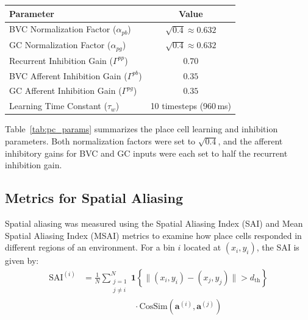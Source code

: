 \documentclass[conference]{IEEEtran}
\begin{document}
\newpage

\begin{center}
\label{tab:pc_params}

\begin{tabular}{l c}
\hline
\textbf{Parameter} & \textbf{Value} \\
\hline
BVC Normalization Factor ($\alpha_{pb}$) & $\sqrt{0.4} \approx 0.632$ \\
GC Normalization Factor ($\alpha_{pg}$) & $\sqrt{0.4} \approx 0.632$ \\
Recurrent Inhibition Gain ($\Gamma^{pp}$) & $0.70$ \\
BVC Afferent Inhibition Gain ($\Gamma^{pb}$) & $0.35$ \\
GC Afferent Inhibition Gain ($\Gamma^{pg}$) & $0.35$ \\
Learning Time Constant ($\tau_w$) & 10 timesteps (960\,ms) \\
\hline
\end{tabular}
\end{center}

Table~\ref{tab:pc_params} summarizes the place cell learning and inhibition parameters. Both normalization factors were set to $\sqrt{0.4}$, and the afferent inhibitory gains for BVC and GC inputs were each set to half the recurrent inhibition gain.


\subsection{Metrics for Spatial Aliasing}
\label{sec:spa_aliasing}

Spatial aliasing was measured using the Spatial Aliasing Index (SAI) and Mean Spatial Aliasing Index (MSAI) metrics to examine how place cells responded in different regions of an environment. For a bin $i$ located at $(x_i, y_i)$, the SAI is given by:
\begin{equation}
\begin{aligned}
\mathrm{SAI}^{(i)} &=
\frac{1}{N}\sum_{\substack{j=1\\ j\neq i}}^{N}
\mathbf{1}\!\left\{\lVert (x_i,y_i)-(x_j,y_j)\rVert > d_{\mathrm{th}}\right\} \\
&\hspace{6em}\cdot \mathrm{CosSim}\!\left(\mathbf{a}^{(i)},\mathbf{a}^{(j)}\right)
\end{aligned}
\end{equation}
\end{document}
